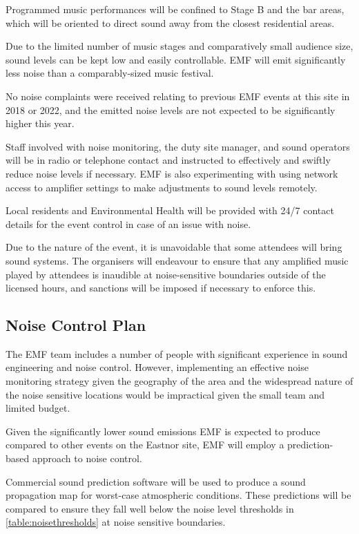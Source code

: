 Programmed music performances will be confined to Stage B and the bar areas, which
will be oriented to direct sound away from the closest residential areas.

Due to the limited number of music stages and comparatively small audience size,
sound levels can be kept low and easily controllable. EMF will emit significantly
less noise than a comparably-sized music festival.

No noise complaints were received relating to previous EMF events at this site in
2018 or 2022, and the emitted noise levels are not expected to be significantly
higher this year.

Staff involved with noise monitoring, the duty site manager, and sound operators
will be in radio or telephone contact and instructed to effectively and swiftly
reduce noise levels if necessary. EMF is also experimenting with using network
access to amplifier settings to make adjustments to sound levels remotely.

Local residents and Environmental Health will be provided with 24/7 contact
details for the event control in case of an issue with noise.

Due to the nature of the event, it is unavoidable that some attendees will
bring sound systems.  The organisers will endeavour to ensure that any
amplified music played by attendees is inaudible at noise-sensitive boundaries
outside of the licensed hours, and sanctions will be imposed if necessary to enforce
this.

\subsection{Noise Control Plan}
The EMF team includes a number of people with significant experience in sound
engineering and noise control. However, implementing an effective noise monitoring
strategy given the geography of the area and the widespread nature of the noise
sensitive locations would be impractical given the small team and limited budget.

Given the significantly lower sound emissions EMF is expected to produce compared to
other events on the Eastnor site, EMF will employ a prediction-based approach to
noise control.

Commercial sound prediction software will be used to produce a sound
propagation map for worst-case atmospheric conditions. These predictions will be compared
to ensure they fall well below the noise level thresholds in \cref{table:noisethresholds}
at noise sensitive boundaries.

